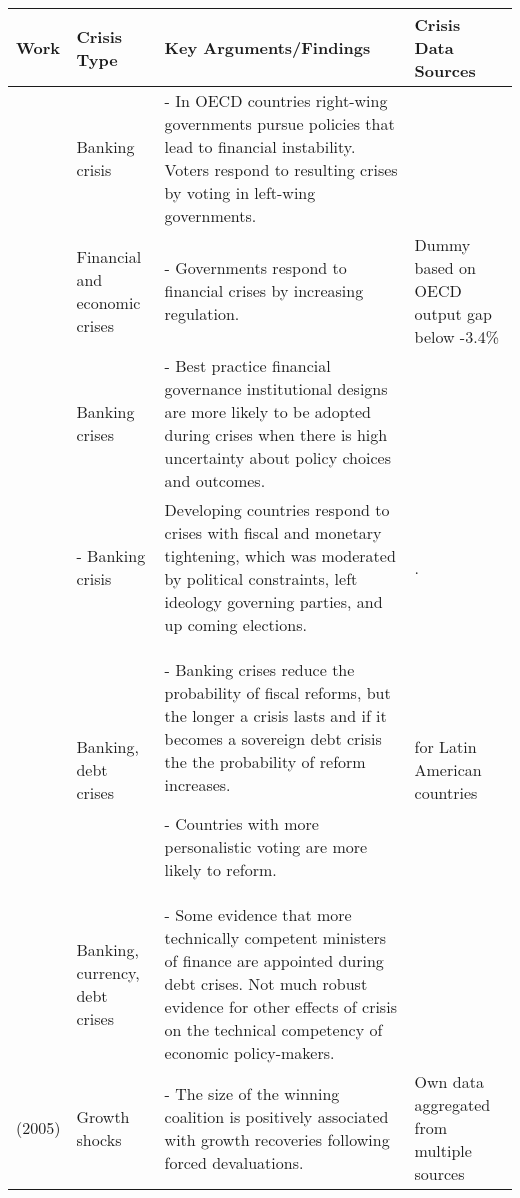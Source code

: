 \begin{tabular}{ m{2.5cm} m{2cm} m{7cm} m{3cm}}
    \hline
    Work & Crisis Type & Key Arguments/Findings & Crisis Data Sources \\
    \hline\hline

    \cite{broz2013} & Banking crisis & - In OECD countries right-wing governments pursue policies that lead to financial instability. Voters respond to resulting crises by voting in left-wing governments. & \cite{Reinhart2009,Laeven2012} \\[0.25cm]\hline

    \cite{galasso2014} & Financial and economic crises & - Governments respond to financial crises by increasing regulation. & Dummy based on OECD output gap below -3.4\% \\[0.25cm]\hline

    \cite{Gandrud2013,Gandrud2014} & Banking crises & - Best practice financial governance institutional designs are more likely to be adopted during crises when there is high uncertainty about policy choices and outcomes. & \cite{Laeven2008,ReinhartRog2010} \\[0.25cm]\hline

    \cite{ha2015} & - Banking crisis & Developing countries respond to crises with fiscal and monetary tightening, which was moderated by political constraints, left ideology governing parties, and up coming elections. & \cite{Laeven2008}. \\[0.25cm]\hline

    \cite{HallerbergScartForthcoming} & Banking, debt crises & - Banking crises reduce the probability of fiscal reforms, but the longer a crisis lasts and if it becomes a sovereign debt crisis the the probability of reform increases.

    - Countries with more personalistic voting are more likely to reform. & \cite{Laeven2012} for Latin American countries \\[0.25cm]\hline

    \cite{Hallerberg2013} & Banking, currency, debt crises & - Some evidence that more technically competent ministers of finance are appointed during debt crises. Not much robust evidence for other effects of crisis on the technical competency of economic policy-makers. & \cite{Laeven2012}  \\[0.25cm]\hline

    \cite{Hicken2005} (2005) & Growth shocks & - The size of the winning coalition is positively associated with growth recoveries following forced devaluations. & Own data aggregated from multiple sources \\[0.25cm]\hline


\end{tabular}
